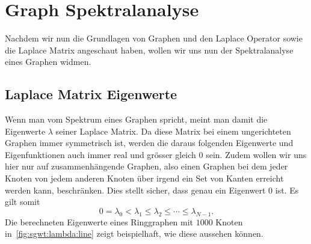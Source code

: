 
\section{Graph Spektralanalyse\label{sec:sgwt:spectralanalysis}}

Nachdem wir nun die Grundlagen von Graphen und den Laplace Operator sowie die 
Laplace Matrix angeschaut haben, wollen wir uns nun der Spektralanalyse eines 
Graphen widmen.

\subsection{Laplace Matrix Eigenwerte}

Wenn man vom Spektrum eines Graphen spricht, meint man damit die Eigenwerte 
$\lambda$ seiner Laplace Matrix. Da diese Matrix bei einem ungerichteten 
Graphen immer symmetrisch ist, werden die daraus folgenden Eigenwerte und 
Eigenfunktionen auch immer real und gr\"osser gleich $0$ sein. Zudem wollen wir 
uns hier nur auf zusammenh\"angende Graphen, also einen Graphen bei dem jeder 
Knoten von jedem anderen Knoten \"uber irgend ein Set von Kanten erreicht 
werden kann, beschr\"anken. Dies stellt sicher, dass genau ein Eigenwert $0$ 
ist. Es gilt somit
\begin{equation}
0 = \lambda_0 < \lambda_1 \leq \lambda_2 \leq \cdots \leq \lambda_{N-1}.
\label{eq:sgwt:lambda:series}
\end{equation}
Die berechneten Eigenwerte eines Ringgraphen mit $1000$ Knoten 
in~\cref{fig:sgwt:lambda:line} zeigt beispielhaft, wie diese aussehen k\"onnen.
